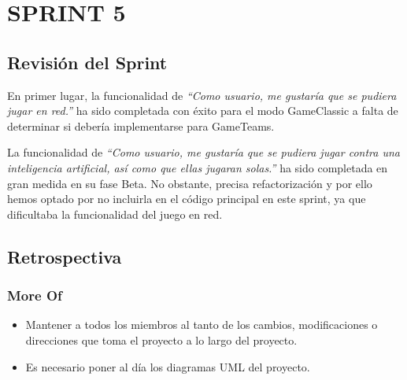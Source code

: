 \documentclass[../../FINAL/Scrum/SCRUM.tex]{subfiles}
\begin{document}
\section{SPRINT 5}
\subsection{Revisión del Sprint}
En primer lugar, la funcionalidad de \textit{``Como usuario, me gustaría
que se pudiera jugar en red.''} ha sido completada con éxito para el
modo GameClassic a falta de determinar si debería implementarse para
GameTeams.

La funcionalidad de \textit{``Como usuario, me gustaría que se pudiera
jugar contra una inteligencia artificial, así como que ellas jugaran
solas.''} ha sido completada en gran medida en su fase Beta. No
obstante, precisa refactorización y por ello hemos optado por no
incluirla en el código principal en este sprint, ya que dificultaba la
funcionalidad del juego en red.

\subsection{Retrospectiva}

\subsubsection*{More Of}
\begin{itemize}
\item
  Mantener a todos los miembros al tanto de los cambios, modificaciones
  o direcciones que toma el proyecto a lo largo del proyecto.
\item
  Es necesario poner al día los diagramas UML del proyecto.
\end{itemize}
\end{document}
